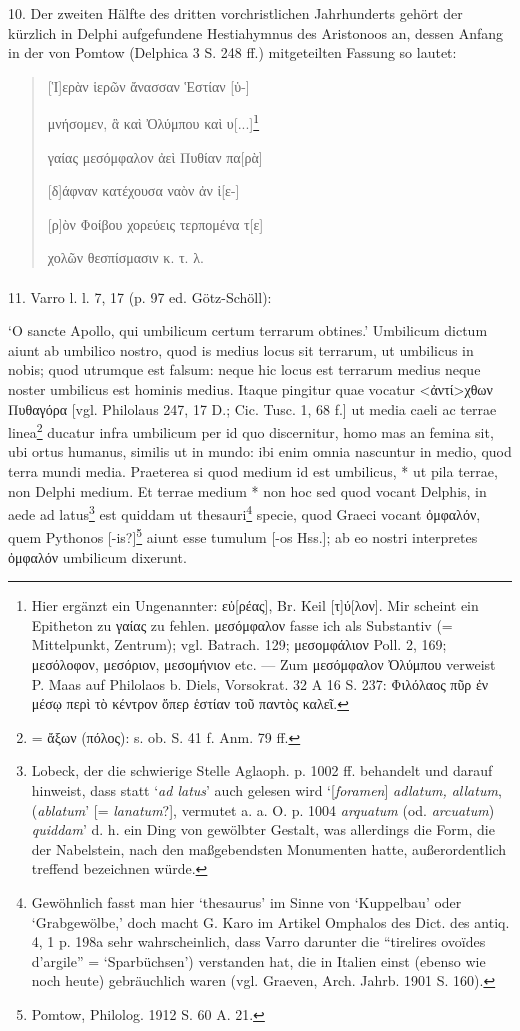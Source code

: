 \documentclass[a4paper, 11pt, oneside]{article}
\begin{document}
10. Der zweiten Hälfte des dritten vorchristlichen Jahrhunderts gehört der kürzlich in Delphi aufgefundene Hestiahymnus des Aristonoos an, dessen Anfang in der von Pomtow (Delphica 3 S. 248 ff.) mitgeteilten Fassung so lautet:
\begin{quotation}
[Ἱ]ερὰν ἱερῶν ἄνασσαν Ἑστίαν [ὑ-]

μνήσομεν, ἃ καὶ Ὀλύμπου καὶ υ[...]\footnote{Hier ergänzt ein Ungenannter: εὐ[ρέας], Br. Keil [τ]ύ[λον]. Mir scheint ein Epitheton zu γαίας zu fehlen. μεσόμφαλον fasse ich als Substantiv (= Mittelpunkt, Zentrum); vgl. Batrach. 129; μεσομφάλιον Poll. 2, 169; μεσόλοφον, μεσόριον, μεσομήνιον etc. --- Zum μεσόμφαλον Ὀλύμπου verweist P. Maas auf Philolaos b. Diels, Vorsokrat. 32 A 16 S. 237: Φιλόλαος πῦρ ἐν μέσῳ περὶ τὸ κέντρον ὅπερ ἑστίαν τοῦ παντὸς καλεῖ.}

γαίας μεσόμφαλον ἀεὶ Πυθίαν πα[ρὰ]

[δ]άφναν κατέχουσα ναὸν ἀν ἱ[ε-]

[ρ]ὸν Φοίβου χορεύεις τερπομένα τ[ε]

χολῶν θεσπίσμασιν κ. τ. λ.
\end{quotation}
\paragraph{}
11. Varro l. l. 7, 17 (p. 97 ed. Götz-Schöll):

`O sancte Apollo, qui umbilicum certum terrarum obtines.' Umbilicum dictum aiunt ab umbilico nostro, quod is medius locus sit terrarum, ut umbilicus in nobis; quod utrumque est falsum: neque hic locus est terrarum medius neque noster umbilicus est hominis medius. Itaque pingitur quae vocatur <ἀντί>χθων Πυθαγόρα [vgl. Philolaus 247, 17 D.; Cic. Tusc. 1, 68 f.] ut media caeli ac terrae linea\footnote{= ἄξων (πόλος): s. ob. S. 41 f. Anm. 79 ff.} ducatur infra umbilicum per id quo discernitur, homo mas an femina sit, ubi ortus humanus, similis ut in mundo: ibi enim omnia nascuntur in medio, quod terra mundi media. Praeterea si quod medium id est umbilicus, * ut pila terrae, non Delphi medium. Et terrae medium * non hoc sed quod vocant Delphis, in aede ad latus\footnote{Lobeck, der die schwierige Stelle Aglaoph. p. 1002 ff. behandelt und darauf hinweist, dass statt `\emph{ad latus}' auch gelesen wird `[\emph{foramen}] \emph{adlatum, allatum}, (\emph{ablatum}' [= \emph{lanatum}?], vermutet a. a. O. p. 1004 \emph{arquatum} (od. \emph{arcuatum}) \emph{quiddam}' d. h. ein Ding von gewölbter Gestalt, was allerdings die Form, die der Nabelstein, nach den maßgebendsten Monumenten hatte, außerordentlich treffend bezeichnen würde.} est quiddam ut thesauri\footnote{Gewöhnlich fasst man hier `thesaurus' im Sinne von `Kuppelbau' oder `Grabgewölbe,' doch macht G. Karo im Artikel Omphalos des Dict. des antiq. 4, 1 p. 198a sehr wahrscheinlich, dass Varro darunter die "`tirelires ovoïdes d'argile"' = `Sparbüchsen') verstanden hat, die in Italien einst (ebenso wie noch heute) gebräuchlich waren (vgl. Graeven, Arch. Jahrb. 1901 S. 160).} specie, quod Graeci vocant ὀμφαλόν, quem Pythonos [-is?]\footnote{Pomtow, Philolog. 1912 S. 60 A. 21.} aiunt esse tumulum [-os Hss.]; ab eo nostri interpretes ὀμφαλόν umbilicum dixerunt.
\end{document}
